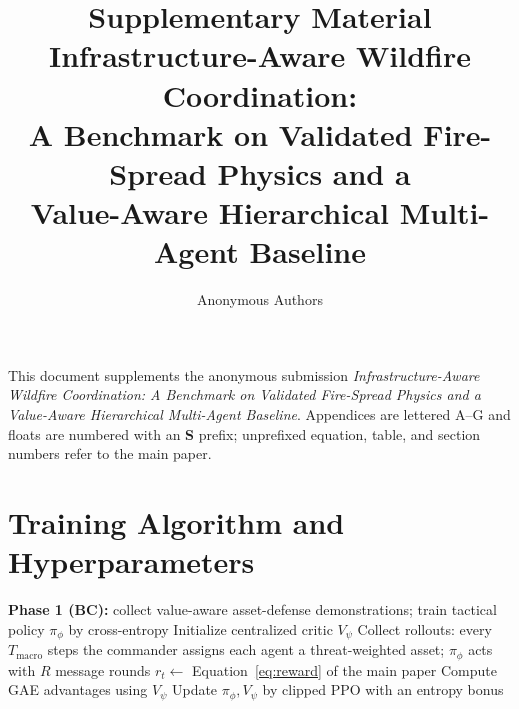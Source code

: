 \documentclass[letterpaper]{article}
\title{Supplementary Material \\ Infrastructure-Aware Wildfire Coordination: \\ A Benchmark on Validated Fire-Spread Physics and a \\ Value-Aware Hierarchical Multi-Agent Baseline}
\author{Anonymous Authors}
\begin{document}
\maketitle

\raggedbottom

\appendix
\renewcommand{\thetable}{S\arabic{table}}
\renewcommand{\thefigure}{S\arabic{figure}}
\renewcommand{\thealgorithm}{S\arabic{algorithm}}
\setcounter{table}{0}
\setcounter{figure}{0}

\noindent This document supplements the anonymous submission \emph{Infrastructure-Aware Wildfire Coordination: A Benchmark on Validated Fire-Spread Physics and a Value-Aware Hierarchical Multi-Agent Baseline}. Appendices are lettered A--G and floats are numbered with an \textbf{S} prefix; unprefixed equation, table, and section numbers refer to the main paper.

\section{Training Algorithm and Hyperparameters}
\label{app:hyperparameters}

\begin{algorithm}[H]
	\caption{HiVA Training}
	\label{alg:training}
	\begin{algorithmic}[1]
		\STATE \textbf{Phase 1 (BC):} collect value-aware asset-defense demonstrations; train tactical policy $\pi_\phi$ by cross-entropy
		\STATE Initialize centralized critic $V_\psi$
		\STATE Collect rollouts: every $T_{\text{macro}}$ steps the commander assigns each agent a threat-weighted asset; $\pi_\phi$ acts with $R$ message rounds
		\STATE $r_t \leftarrow$ Equation~\ref{eq:reward} of the main paper
		\STATE Compute GAE advantages using $V_\psi$
		\STATE Update $\pi_\phi, V_\psi$ by clipped PPO with an entropy bonus
		\ENDFOR
	\end{algorithmic}
\end{algorithm}
\end{document}
